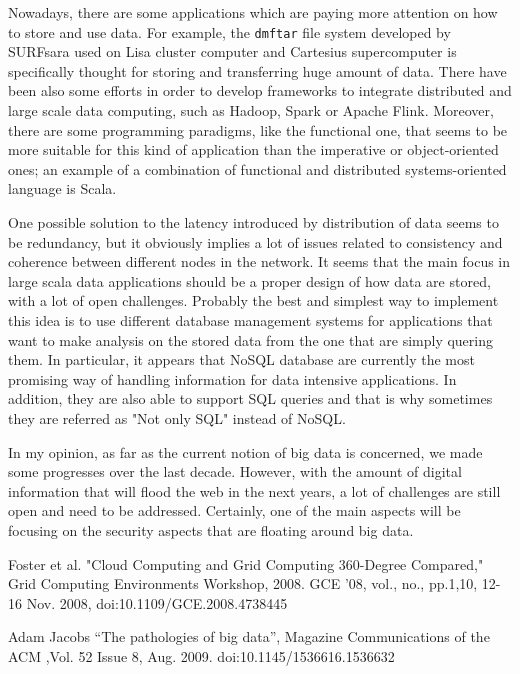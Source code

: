 \documentclass[a4paper]{IEEEtran}
\begin{document}
Nowadays, there are some applications which are paying more attention on how to store and use data. For example, the \texttt{dmftar} file system developed by SURFsara used on Lisa cluster computer and Cartesius supercomputer is specifically thought for storing and transferring huge amount of data. There have been also some efforts in order to develop frameworks to integrate distributed and large scale data computing, such as Hadoop, Spark or Apache Flink. Moreover, there are some programming paradigms, like the functional one, that seems to be more suitable for this kind of application than the imperative or object-oriented ones; an example of a combination of functional and distributed systems-oriented language is Scala.

One possible solution to the latency introduced by distribution of data seems to be redundancy, but it obviously implies a lot of issues related to consistency and coherence between different nodes in the network.
It seems that the main focus in large scala data applications should be a proper design of how data are stored, with a lot of open challenges. Probably the best and simplest way to implement this idea is to use different database management systems for applications that want to make analysis on the stored data from the one that are simply quering them. In particular, it appears that NoSQL database are currently the most promising way of handling information for data intensive applications. In addition, they are also able to support SQL queries and that is why sometimes they are referred as "Not only SQL" instead of NoSQL.

In my opinion, as far as the current notion of big data is concerned, we made some progresses over the last decade. However, with the amount of digital information that will flood the web in the next years, a lot of challenges are still open and need to be addressed. Certainly, one of the main aspects will be focusing on the security aspects that are floating around big data.

\begin{thebibliography}{1}

Foster  et  al.  "Cloud  Computing  and  Grid  Computing  360-Degree  Compared," Grid Computing Environments Workshop, 2008. GCE '08, vol., no., pp.1,10, 12-16 Nov. 2008, doi:10.1109/GCE.2008.4738445

Adam  Jacobs  “The  pathologies  of  big  data”,  Magazine Communications  of  the ACM ,Vol. 52 Issue 8, Aug. 2009. doi:10.1145/1536616.1536632

\end{thebibliography}
\end{document}
